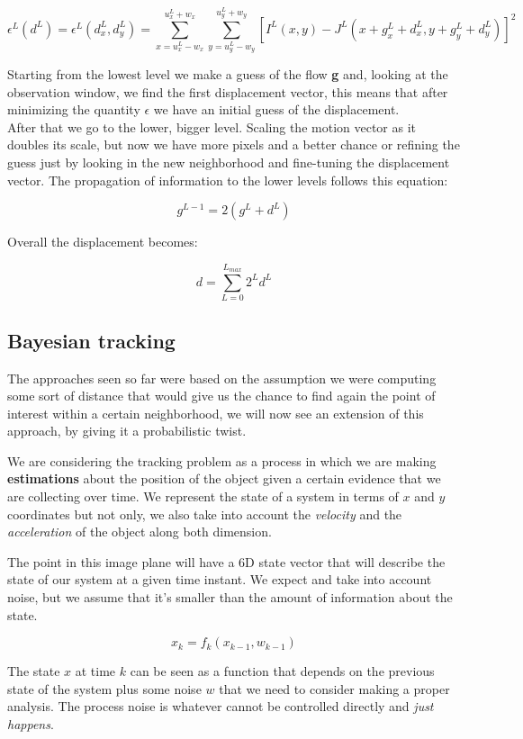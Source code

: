 \[
\epsilon^L(d^L) = \epsilon^L(d^L_x, d^L_y) = \sum_{x=u^L_x-w_x}^{u^L_x+w_x} \sum_{y=u^L_y-w_y}^{u^L_y+w_y} \left[I^L(x, y) - J^L(x+ g^L_x +d^L_x, y+g^L_y+d^L_y)\right]^2
\]

Starting from the lowest level we make a guess of the flow \textbf{g} and, looking at the observation window, we find the first displacement vector, this means that after minimizing the quantity $\epsilon$ we have an initial guess of the displacement.
\\

After that we go to the lower, bigger level. Scaling the motion vector as it doubles its scale, but now we have more pixels and a better chance or refining the guess just by looking in the new neighborhood and fine-tuning the displacement vector. The propagation of information to the lower levels follows this equation:

\[
    g^{L-1} = 2(g^L+d^L)
\]

Overall the displacement becomes:

\[
    d = \sum_{L=0}^{L_{max}} 2^Ld^L    
\]



\subsection{Bayesian tracking}

The approaches seen so far were based on the assumption we were computing some sort of distance that would give us the chance to find again the point of interest within a certain neighborhood, we will now see an extension of this approach, by giving it a probabilistic twist.

We are considering the tracking problem as a process in which we are making \textbf{estimations} about the position of the object given a certain evidence that we are collecting over time. We represent the state of a system in terms of $x$ and $y$ coordinates but not only, we also take into account the \textit{velocity} and the \textit{acceleration} of the object along both dimension.

The point in this image plane will have a 6D state vector that will describe the state of our system at a given time instant. We expect and take into account noise, but we assume that it's smaller than the amount of information about the state.

\[
    x_k = f_k(x_{k-1}, w_{k-1})
\]

The state $x$ at time $k$ can be seen as a function that depends on the previous state of the system plus some noise $w$ that we need to consider making a proper analysis. The process noise is whatever cannot be controlled directly and \textit{just happens}.

